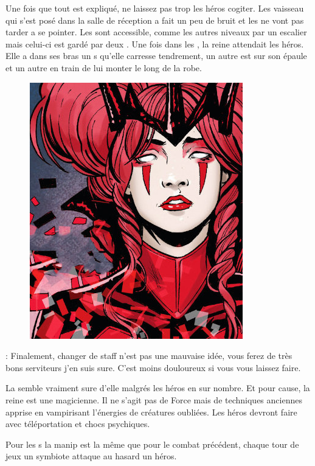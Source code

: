 Une fois que tout est expliqué, ne laissez pas trop les héros cogiter. Les vaisseau qui s’est posé dans la salle de réception a fait un peu de bruit et les  ne vont pas tarder a se pointer.
\bigbreak
Les  sont accessible, comme les autres niveaux par un escalier mais celui-ci est gardé par deux . Une fois dans les , la reine attendait les héros. Elle a dans ses bras un s qu’elle carresse tendrement, un autre est sur son épaule et un autre en train de lui monter le long de la robe.

\begin{figure}[h]
\noindent\includegraphics[width=\linewidth]{_img/pnjs/ktath-atn-queen-fight.jpg}
\end{figure}
\begin{quotebox}
\noindent\textbf{}: Finalement, changer de staff n’est pas une mauvaise idée, vous ferez de très bons serviteurs j’en suis sure. C’est moins douloureux si vous vous laissez faire.
\end{quotebox}

La  semble vraiment sure d’elle malgrés les héros en sur nombre. Et pour cause, la reine est une magicienne. Il ne s’agit pas de Force mais de techniques anciennes apprise en vampirisant l’énergies de créatures oubliées. Les héros devront faire avec téléportation et chocs psychiques.

Pour les s la manip est la même que pour le combat précédent, chaque tour de jeux un symbiote attaque au hasard un héros.
